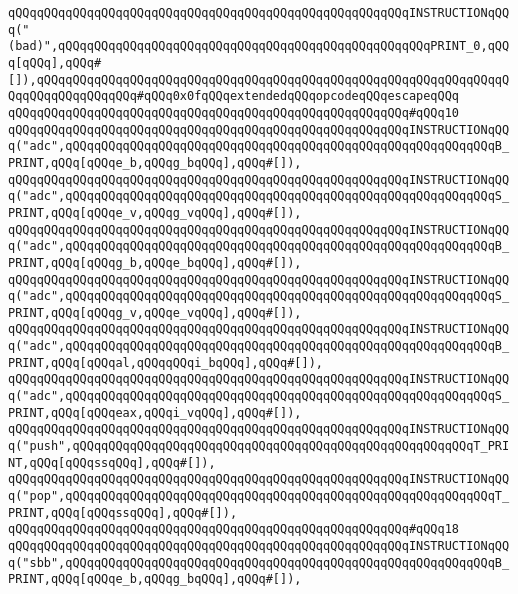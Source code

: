 \verb|qQQqqQQqqQQqqQQqqQQqqQQqqQQqqQQqqQQqqQQqqQQqqQQqqQQqqQQqINSTRUCTIONqQQq("(bad)",qQQqqQQqqQQqqQQqqQQqqQQqqQQqqQQqqQQqqQQqqQQqqQQqqQQqPRINT_0,qQQq[qQQq],qQQq#[]),qQQqqQQqqQQqqQQqqQQqqQQqqQQqqQQqqQQqqQQqqQQqqQQqqQQqqQQqqQQqqQQqqQQqqQQqqQQqqQQqqQQq#qQQq0x0fqQQqextendedqQQqopcodeqQQqescapeqQQq|\newline
\verb|qQQqqQQqqQQqqQQqqQQqqQQqqQQqqQQqqQQqqQQqqQQqqQQqqQQqqQQq#qQQq10|\newline
\verb|qQQqqQQqqQQqqQQqqQQqqQQqqQQqqQQqqQQqqQQqqQQqqQQqqQQqqQQqINSTRUCTIONqQQq("adc",qQQqqQQqqQQqqQQqqQQqqQQqqQQqqQQqqQQqqQQqqQQqqQQqqQQqqQQqqQQqB_PRINT,qQQq[qQQqe_b,qQQqg_bqQQq],qQQq#[]),|\newline
\verb|qQQqqQQqqQQqqQQqqQQqqQQqqQQqqQQqqQQqqQQqqQQqqQQqqQQqqQQqINSTRUCTIONqQQq("adc",qQQqqQQqqQQqqQQqqQQqqQQqqQQqqQQqqQQqqQQqqQQqqQQqqQQqqQQqqQQqS_PRINT,qQQq[qQQqe_v,qQQqg_vqQQq],qQQq#[]),|\newline
\verb|qQQqqQQqqQQqqQQqqQQqqQQqqQQqqQQqqQQqqQQqqQQqqQQqqQQqqQQqINSTRUCTIONqQQq("adc",qQQqqQQqqQQqqQQqqQQqqQQqqQQqqQQqqQQqqQQqqQQqqQQqqQQqqQQqqQQqB_PRINT,qQQq[qQQqg_b,qQQqe_bqQQq],qQQq#[]),|\newline
\verb|qQQqqQQqqQQqqQQqqQQqqQQqqQQqqQQqqQQqqQQqqQQqqQQqqQQqqQQqINSTRUCTIONqQQq("adc",qQQqqQQqqQQqqQQqqQQqqQQqqQQqqQQqqQQqqQQqqQQqqQQqqQQqqQQqqQQqS_PRINT,qQQq[qQQqg_v,qQQqe_vqQQq],qQQq#[]),|\newline
\verb|qQQqqQQqqQQqqQQqqQQqqQQqqQQqqQQqqQQqqQQqqQQqqQQqqQQqqQQqINSTRUCTIONqQQq("adc",qQQqqQQqqQQqqQQqqQQqqQQqqQQqqQQqqQQqqQQqqQQqqQQqqQQqqQQqqQQqB_PRINT,qQQq[qQQqal,qQQqqQQqi_bqQQq],qQQq#[]),|\newline
\verb|qQQqqQQqqQQqqQQqqQQqqQQqqQQqqQQqqQQqqQQqqQQqqQQqqQQqqQQqINSTRUCTIONqQQq("adc",qQQqqQQqqQQqqQQqqQQqqQQqqQQqqQQqqQQqqQQqqQQqqQQqqQQqqQQqqQQqS_PRINT,qQQq[qQQqeax,qQQqi_vqQQq],qQQq#[]),|\newline
\verb|qQQqqQQqqQQqqQQqqQQqqQQqqQQqqQQqqQQqqQQqqQQqqQQqqQQqqQQqINSTRUCTIONqQQq("push",qQQqqQQqqQQqqQQqqQQqqQQqqQQqqQQqqQQqqQQqqQQqqQQqqQQqqQQqT_PRINT,qQQq[qQQqssqQQq],qQQq#[]),|\newline
\verb|qQQqqQQqqQQqqQQqqQQqqQQqqQQqqQQqqQQqqQQqqQQqqQQqqQQqqQQqINSTRUCTIONqQQq("pop",qQQqqQQqqQQqqQQqqQQqqQQqqQQqqQQqqQQqqQQqqQQqqQQqqQQqqQQqqQQqT_PRINT,qQQq[qQQqssqQQq],qQQq#[]),|\newline
\verb|qQQqqQQqqQQqqQQqqQQqqQQqqQQqqQQqqQQqqQQqqQQqqQQqqQQqqQQq#qQQq18|\newline
\verb|qQQqqQQqqQQqqQQqqQQqqQQqqQQqqQQqqQQqqQQqqQQqqQQqqQQqqQQqINSTRUCTIONqQQq("sbb",qQQqqQQqqQQqqQQqqQQqqQQqqQQqqQQqqQQqqQQqqQQqqQQqqQQqqQQqqQQqB_PRINT,qQQq[qQQqe_b,qQQqg_bqQQq],qQQq#[]),|\newline
